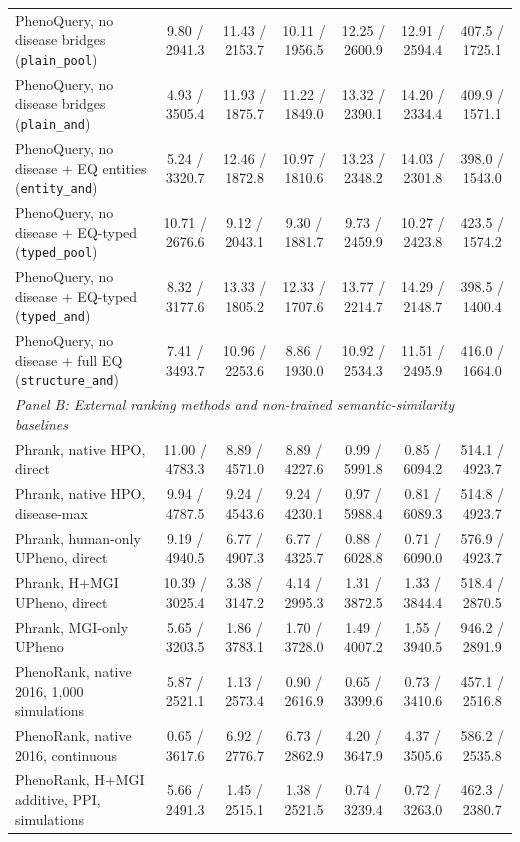 \begin{table}[tb]
\begin{tabular}{lcccccc}
PhenoQuery, no disease bridges (\texttt{plain\_pool}) & 9.80 / 2941.3 & 11.43 / 2153.7 & 10.11 / 1956.5 & 12.25 / 2600.9 & 12.91 / 2594.4 & 407.5 / 1725.1 \\
PhenoQuery, no disease bridges (\texttt{plain\_and}) & 4.93 / 3505.4 & 11.93 / 1875.7 & 11.22 / 1849.0 & 13.32 / 2390.1 & 14.20 / 2334.4 & 409.9 / 1571.1 \\
PhenoQuery, no disease + EQ entities (\texttt{entity\_and}) & 5.24 / 3320.7 & 12.46 / 1872.8 & 10.97 / 1810.6 & 13.23 / 2348.2 & 14.03 / 2301.8 & 398.0 / 1543.0 \\
PhenoQuery, no disease + EQ-typed (\texttt{typed\_pool}) & 10.71 / 2676.6 & 9.12 / 2043.1 & 9.30 / 1881.7 & 9.73 / 2459.9 & 10.27 / 2423.8 & 423.5 / 1574.2 \\
PhenoQuery, no disease + EQ-typed (\texttt{typed\_and}) & 8.32 / 3177.6 & 13.33 / 1805.2 & 12.33 / 1707.6 & 13.77 / 2214.7 & 14.29 / 2148.7 & 398.5 / 1400.4 \\
PhenoQuery, no disease + full EQ (\texttt{structure\_and}) & 7.41 / 3493.7 & 10.96 / 2253.6 & 8.86 / 1930.0 & 10.92 / 2534.3 & 11.51 / 2495.9 & 416.0 / 1664.0 \\
\midrule
\multicolumn{7}{l}{\emph{Panel B: External ranking methods and non-trained semantic-similarity baselines}} \\
Phrank, native HPO, direct & 11.00 / 4783.3 & 8.89 / 4571.0 & 8.89 / 4227.6 & 0.99 / 5991.8 & 0.85 / 6094.2 & 514.1 / 4923.7 \\
Phrank, native HPO, disease-max & 9.94 / 4787.5 & 9.24 / 4543.6 & 9.24 / 4230.1 & 0.97 / 5988.4 & 0.81 / 6089.3 & 514.8 / 4923.7 \\
Phrank, human-only UPheno, direct & 9.19 / 4940.5 & 6.77 / 4907.3 & 6.77 / 4325.7 & 0.88 / 6028.8 & 0.71 / 6090.0 & 576.9 / 4923.7 \\
Phrank, H+MGI UPheno, direct & 10.39 / 3025.4 & 3.38 / 3147.2 & 4.14 / 2995.3 & 1.31 / 3872.5 & 1.33 / 3844.4 & 518.4 / 2870.5 \\
Phrank, MGI-only UPheno & 5.65 / 3203.5 & 1.86 / 3783.1 & 1.70 / 3728.0 & 1.49 / 4007.2 & 1.55 / 3940.5 & 946.2 / 2891.9 \\
PhenoRank, native 2016, 1,000 simulations & 5.87 / 2521.1 & 1.13 / 2573.4 & 0.90 / 2616.9 & 0.65 / 3399.6 & 0.73 / 3410.6 & 457.1 / 2516.8 \\
PhenoRank, native 2016, continuous & 0.65 / 3617.6 & 6.92 / 2776.7 & 6.73 / 2862.9 & 4.20 / 3647.9 & 4.37 / 3505.6 & 586.2 / 2535.8 \\
PhenoRank, H+MGI additive, PPI, simulations & 5.66 / 2491.3 & 1.45 / 2515.1 & 1.38 / 2521.5 & 0.74 / 3239.4 & 0.72 / 3263.0 & 462.3 / 2380.7 \\

\end{tabular}
\end{table}
